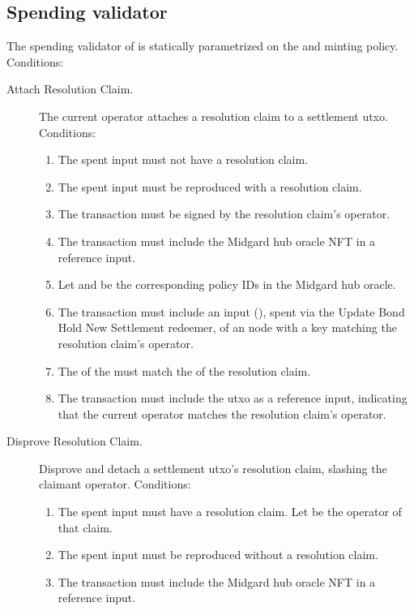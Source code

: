 \documentclass[../midgard.tex]{subfiles}
\begin{document}
\subsection{Spending validator}
\label{h:settlement-spending-validator}

The spending validator of  is statically parametrized on the  and  minting policy.
Conditions:
\begin{description}
  \item[Attach Resolution Claim.] The current operator attaches a resolution claim to a settlement utxo.
    Conditions:
      \begin{enumerate}
        \item The spent input must not have a resolution claim.
        \item The spent input must be reproduced with a resolution claim.
        \item The transaction must be signed by the resolution claim's operator.
        \item The transaction must include the Midgard hub oracle NFT in a reference input.
        \item Let  and  be the corresponding policy IDs in the Midgard hub oracle.
        \item The transaction must include an input (), spent via the Update Bond Hold New Settlement redeemer, of an  node with a key matching the resolution claim's operator.
        \item The  of the  must match the  of the resolution claim.
        \item The transaction must include the  utxo as a reference input, indicating that the current operator matches the resolution claim's operator.
      \end{enumerate}
  \item[Disprove Resolution Claim.] Disprove and detach a settlement utxo's resolution claim, slashing the claimant operator.
    Conditions:
      \begin{enumerate}
        \item The spent input must have a resolution claim.
          Let  be the operator of that claim.
        \item The spent input must be reproduced without a resolution claim.
        \item The transaction must include the Midgard hub oracle NFT in a reference input.

\end{enumerate}
\end{description}
\end{document}
